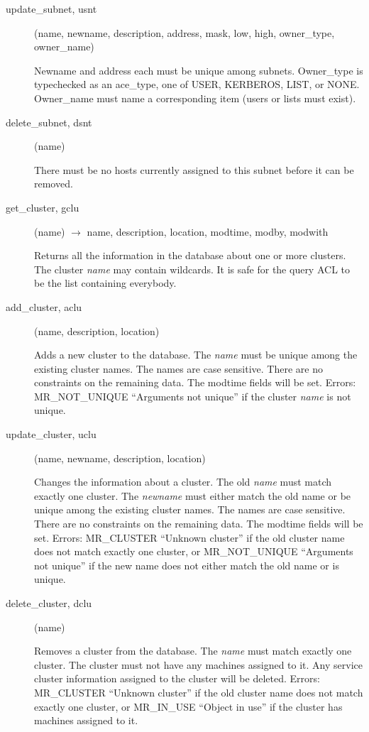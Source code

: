 \documentclass{article}
\begin{document}
\begin{description}
\item[update\_subnet, usnt](name, newname, description, address, mask, low, high,
owner\_type, owner\_name)

Newname and address each must be unique among subnets.  Owner\_type
is typechecked as an ace\_type, one of USER, KERBEROS, LIST, or NONE.
Owner\_name must name a corresponding item (users or lists must exist).

\item[delete\_subnet, dsnt](name)

There must be no hosts currently assigned to this subnet
before it can be removed.


\item[get\_cluster, gclu](name) $\rightarrow$ name, description, location,
modtime, modby, modwith

Returns all the information in the database about one or more
clusters.  The cluster {\em name} may contain wildcards.  It is safe for
the query ACL to be the list containing everybody.

\item[add\_cluster, aclu](name, description, location)

Adds a new cluster to the database.  The {\em name} must be unique among
the existing cluster names.  The names are case sensitive.  There are
no constraints on the remaining data.  The modtime fields will be set.
Errors: MR\_NOT\_UNIQUE ``Arguments not unique'' if the cluster {\em name}
is not unique.

\item[update\_cluster, uclu](name, newname, description, location)

Changes the information about a cluster.  The old {\em name} must match
exactly one cluster.  The {\em newname} must either match the old name
or be unique among the existing cluster names.  The names are case
sensitive.  There are no constraints on the remaining data.  The
modtime fields will be set.  Errors: MR\_CLUSTER ``Unknown cluster'' if
the old cluster name does not match exactly one cluster, or
MR\_NOT\_UNIQUE ``Arguments not unique'' if the new name does not either
match the old name or is unique.

\item[delete\_cluster, dclu](name)

Removes a cluster from the database.  The {\em name} must match exactly
one cluster.  The cluster must not have any machines assigned to it.
Any service cluster information assigned to the cluster will be
deleted.  Errors: MR\_CLUSTER ``Unknown cluster'' if the old cluster
name does not match exactly one cluster, or MR\_IN\_USE ``Object in use''
if the cluster has machines assigned to it.


\end{description}
\end{document}
